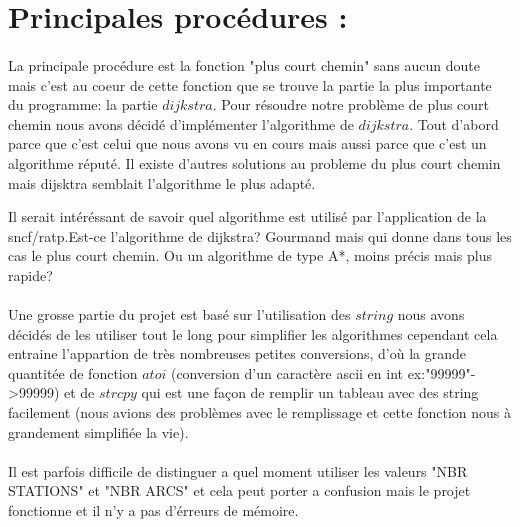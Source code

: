\documentclass[a4paper]{article}
\begin{document}
\section{Principales procédures :}
  \paragraph{}
  La principale procédure est la fonction "plus court chemin" sans aucun doute mais c'est au coeur de cette fonction que se trouve la partie la plus importante du programme: la partie $dijkstra$.
  Pour résoudre notre problème de plus court chemin nous avons décidé d'implémenter l'algorithme de $dijkstra$. Tout d'abord parce que c'est celui que nous avons vu en cours mais aussi parce que c'est un algorithme réputé.
  Il existe d'autres solutions au probleme du plus court chemin mais dijsktra semblait l'algorithme le plus adapté.

  Il serait intéréssant de savoir quel algorithme est utilisé par l'application de la sncf/ratp.Est-ce l'algorithme de dijkstra? Gourmand mais qui donne dans tous les cas le plus court chemin. Ou un algorithme de type A*, moins précis mais plus rapide?
  \paragraph{}
  Une grosse partie du projet est basé sur l'utilisation des $string$ nous avons décidés de les utiliser tout le long pour simplifier les algorithmes cependant cela entraine l'appartion de très nombreuses petites conversions, d'où la grande quantitée de fonction $atoi$ (conversion d'un caractère ascii en int ex:"99999"->99999) et de $strcpy$ qui est une façon de remplir un tableau avec des string facilement (nous avions des problèmes avec le remplissage et cette fonction nous à grandement simplifiée la vie).
  \paragraph{}
  Il est parfois difficile de distinguer a quel moment utiliser les valeurs "NBR STATIONS" et "NBR ARCS" et cela peut porter a confusion mais le projet fonctionne et il n'y a pas d'érreurs de mémoire.
\end{document}
